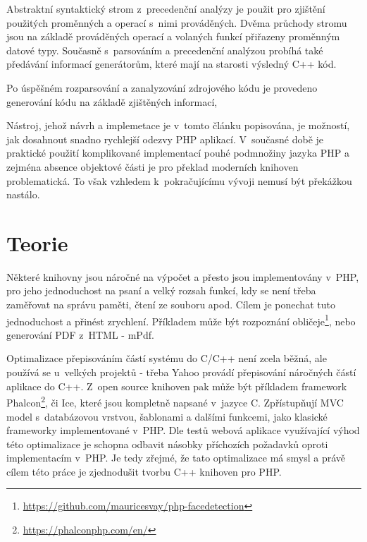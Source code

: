 \documentclass[czech]{ExcelAtFIT}
\begin{document}

		Abstraktní syntaktický strom z~precedenční a\-na\-lý\-zy je použit pro zjištění použitých proměnných a operací s~nimi prováděných. Dvěma průchody stromu jsou na základě prováděných operací a volaných funkcí přiřazeny proměnným datové typy. Současně s~par\-so\-vá\-ním a precedenční analýzou probíhá také předávání informací generátorům, které mají na starosti výsledný C++ kód.

		Po úspěšném rozparsování a zanalyzování zdrojového kódu je provedeno generování kódu na základě zjištěných informací,


		Nástroj, jehož návrh a implemetace je v~tomto článku popisována, je možností, jak dosahnout snadno rychlejší odezvy PHP aplikací. V~současné době je praktické použití komplikované implementací pouhé podmnožiny jazyka PHP a zejména absence objektové části je pro překlad moderních knihoven problematická. To však vzhledem k~pokračujícímu vývoji nemusí být překážkou nastálo.






\section{Teorie}

	Některé knihovny jsou náročné na výpočet a přesto jsou implementovány v~PHP, pro jeho jednoduchost na psaní a velký rozsah funkcí, kdy se není třeba zaměřovat na správu paměti, čtení ze souboru apod. Cílem je ponechat tuto jednoduchost a přinést zrychlení. Pří\-kla\-dem může být rozpoznání obličeje\footnote{\url{https://github.com/mauricesvay/php-facedetection}}, nebo generování PDF z~HTML - mPdf.

	Optimalizace přepisováním částí systému do C/C++ není zcela běžná, ale používá se u~velkých projektů - třeba Yahoo provádí přepisování náročných částí aplikace do C++\cite{yahooCpp}. Z~open source knihoven pak může být příkladem framework Phalcon\footnote{\url{https://phalconphp.com/en/}}, či Ice, které jsou kompletně napsané v~jazyce C. Zpřístupňují MVC model s~databázovou vrstvou, šablonami a dalšími funkcemi, jako klasické frameworky implementované v~PHP. Dle testů\cite{phalconBenchmark} webová aplikace využívající výhod této optimalizace je schopna odbavit násobky pří\-cho\-zích požadavků oproti implementacím v~PHP. Je tedy zřejmé, že tato optimalizace má smysl a právě cílem této práce je zjednodušit tvorbu C++ knihoven pro PHP.
\end{document}
